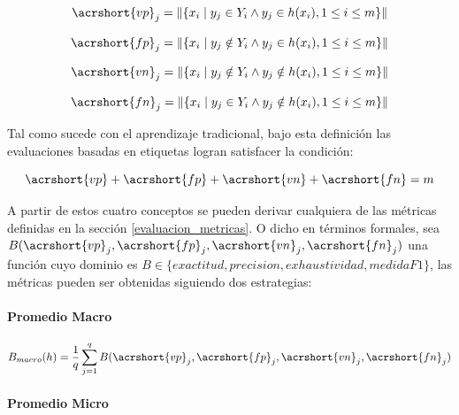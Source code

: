 \begin{equation}
	\acrshort{vp}_{j} = \left\|\{x_{i}\mid y_{j} \in Y_{i} \land y_{j} \in
	h(x_{i}), 1 \leq i \leq m\}\right\|
\end{equation}

\begin{equation}
	\acrshort{fp}_{j} = \left\|\{x_{i}\mid y_{j} \notin Y_{i} \land y_{j} \in
	h(x_{i}), 1 \leq i \leq m\}\right\|
\end{equation}

\begin{equation}
	\acrshort{vn}_{j} = \left\|\{x_{i}\mid y_{j} \notin Y_{i} \land y_{j} \notin
	h(x_{i}), 1 \leq i \leq m\}\right\|
\end{equation}

\begin{equation}
	\acrshort{fn}_{j} = \left\|\{x_{i}\mid y_{j} \in Y_{i} \land y_{j} \notin
	h(x_{i}), 1 \leq i \leq m\}\right\|
\end{equation}

Tal como sucede con el aprendizaje tradicional, bajo esta definición las
evaluaciones basadas en etiquetas logran satisfacer la condición:

\begin{equation}
	\acrshort{vp} + \acrshort{fp} + \acrshort{vn} + \acrshort{fn} = m
\end{equation}

A partir de estos cuatro conceptos se pueden derivar cualquiera de las métricas
definidas en la sección \ref{evaluacion_metricas}. O dicho en términos formales,
sea $B(\acrshort{vp}_{j}, \acrshort{fp}_{j}, \acrshort{vn}_{j},
	\acrshort{fn}_{j})$ una función cuyo dominio es $B \in \{ exactitud, precision,
	exhaustividad, medidaF1 \}$, las métricas pueden ser obtenidas siguiendo dos
estrategias:

\paragraph{Promedio Macro}

\begin{equation}
	B_{macro}(h) = \frac{1}{q} \sum_{j=1}^{q}
	B(\acrshort{vp}_{j}, \acrshort{fp}_{j}, \acrshort{vn}_{j}, \acrshort{fn}_{j})
\end{equation}

\paragraph{Promedio Micro}

